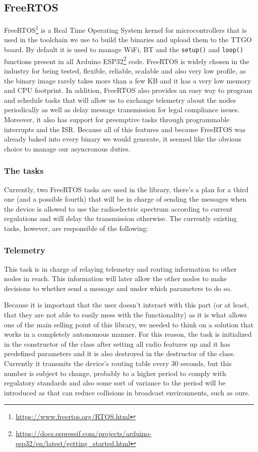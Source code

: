 \subsection{FreeRTOS}
FreeRTOS\footnote{\url{https://www.freertos.org/RTOS.html}} is a Real Time Operating System kernel for microcontrollers that is used in the toolchain we use to build the binaries and upload them to the TTGO board. By default it is used to manage WiFi, BT and the \texttt{setup()} and \texttt{loop()} functions present in all Arduino ESP32\footnote{\url{https://docs.espressif.com/projects/arduino-esp32/en/latest/getting_started.html}} code. FreeRTOS is widely chosen in the industry for being tested, flexible, reliable, scalable and also very low profile, as the binary image rarely takes more than a few KB and it has a very low memory and CPU footprint\cite{FreeRTOSCharacteristics}. In addition, FreeRTOS also provides an easy way to program and schedule tasks that will allow us to exchange telemetry about the nodes periodically as well as delay message transmission for legal compliance issues. Moreover, it also has support for preemptive tasks through programmable interrupts and the ISR.
Because all of this features and because FreeRTOS was already baked into every binary we would generate, it seemed like the obvious choice to manage our asyncronous duties.
\subsubsection{The tasks}
Currently, two FreeRTOS tasks are used in the library, there's a plan for a third one (and a possible fourth) that will be in charge of sending the messages when the device is allowed to use the radioelectric spectrum according to current regulations and will delay the transmission otherwise. The currently existing tasks, however, are responsible of the following:
\subsubsection*{Telemetry}
This task is in charge of relaying telemetry and routing information to other nodes in reach. This information will later allow the other nodes to make decisions to whether send a message and under which parameters to do so.

Because it is important that the user doesn't interact with this part (or at least, that they are not able to easily mess with the functionality) as it is what allows one of the main selling point of this library, we needed to think on a solution that works in a completely autonomous manner. For this reason, the task is initialized in the constructor of the class after setting all radio features up and it has predefined parameters and it is also destroyed in the destructor of the class. Currently it transmits the device's routing table every 30 seconds, but this number is subject to change, probably to a higher period to comply with regulatory standards and also some sort of variance to the period will be introduced as that can reduce collisions\cite{Floyd1994} in broadcast environments, such as ours.

